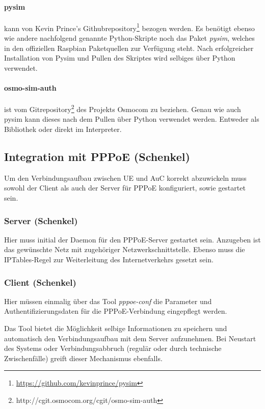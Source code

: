 	\paragraph{pysim} kann von Kevin Prince's Githubrepository\footnote{\url{https://github.com/kevinprince/pysim}} bezogen werden. Es benötigt ebenso
            wie andere nachfolgend genannte Python-Skripte noch das Paket \textit{pysim}, welches
            in den offiziellen Raspbian Paketquellen zur Verfügung steht. Nach erfolgreicher Installation
            von Pysim und Pullen des Skriptes wird selbiges über Python verwendet.

            \paragraph{osmo-sim-auth} ist vom Gitrepository\footnote{\url{}http://cgit.osmocom.org/cgit/osmo-sim-auth}
            des Projekts Osmocom zu  beziehen. Genau wie auch pysim kann dieses nach dem Pullen
            über Python verwendet werden. Entweder als Bibliothek oder direkt im Interpreter.

	\subsection{Integration mit PPPoE (Schenkel)}
        Um den Verbindungsaufbau zwischen UE und \ac{AuC} korrekt abzuwickeln muss sowohl der Client
        als auch der Server für \ac{PPPoE} konfiguriert, sowie gestartet sein.

	\subsubsection{Server (Schenkel)}
         Hier muss initial der Daemon für den \ac{PPPoE}-Server gestartet sein. Anzugeben ist das gewünschte
         Netz mit zugehöriger Netzwerkschnittstelle. Ebenso muss die IPTables-Regel zur Weiterleitung
         des Internetverkehrs gesetzt sein.

         \subsubsection{Client (Schenkel)}
         Hier müssen einmalig über das Tool \textit{pppoe-conf} die Parameter und Authentifizierungsdaten
         für die \ac{PPPoE}-Verbindung eingepflegt werden.

         Das Tool bietet die Möglichkeit selbige Informationen
         zu speichern und automatisch den Verbindungsaufbau mit dem Server aufzunehmen. Bei Neustart
         des Systems oder Verbindungsabbruch (regulär oder durch technische Zwischenfälle) greift dieser
         Mechanismus ebenfalls.
         
